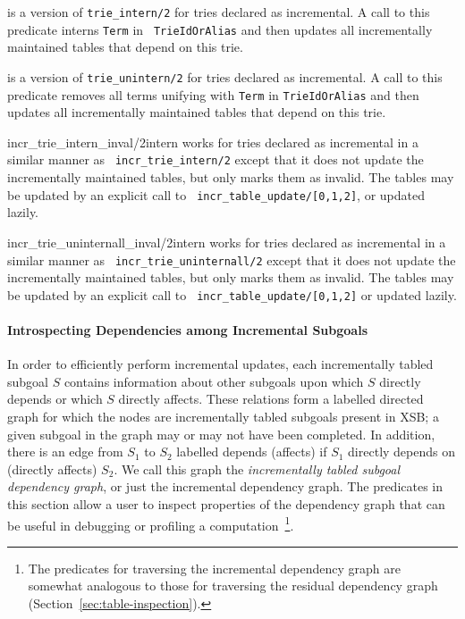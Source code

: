 \begin{description}
%
is a version of {\tt trie\_intern/2} for tries declared as
incremental.  A call to this predicate interns {\tt Term} in {\tt
  TrieIdOrAlias} and then updates all incrementally maintained tables
that depend on this trie.

%
is a version of {\tt trie\_unintern/2} for tries declared as
incremental.  A call to this predicate removes all terms unifying with
{\tt Term} in {\tt TrieIdOrAlias} and then updates all incrementally
maintained tables that depend on this trie.

{incr\_trie\_intern\_inval/2}{intern}
%
works for tries declared as incremental in a similar manner as {\tt
  incr\_trie\_intern/2} except that it does not update the
incrementally maintained tables, but only marks them as invalid. The
tables may be updated by an explicit call to {\tt
  incr\_table\_update/[0,1,2]}, or updated lazily.

{incr\_trie\_uninternall\_inval/2}{intern}
%
works for tries declared as incremental in a similar manner as {\tt
  incr\_trie\_uninternall/2} except that it does not update the
incrementally maintained tables, but only marks them as invalid. The
tables may be updated by an explicit call to {\tt
  incr\_table\_update/[0,1,2]} or updated lazily.
\end{description}

\paragraph{Introspecting Dependencies among Incremental Subgoals}
%
In order to efficiently perform incremental updates, each
incrementally tabled subgoal $S$ contains information about other
subgoals upon which $S$ directly depends or which $S$ directly
affects.  These relations form a labelled directed graph for which the
nodes are incrementally tabled subgoals present in XSB; a given
subgoal in the graph may or may not have been completed.  In addition,
there is an edge from $S_1$ to $S_2$ labelled depends (affects) if
$S_1$ directly depends on (directly affects) $S_2$.  We call this
graph the {\em incrementally tabled subgoal dependency graph}, or just
the incremental dependency graph.  The predicates in this section
allow a user to inspect properties of the dependency graph that can be
useful in debugging or profiling a computation~\footnote{The
  predicates for traversing the incremental dependency graph are
  somewhat analogous to those for traversing the residual dependency
  graph (Section~\ref{sec:table-inspection}).}.

